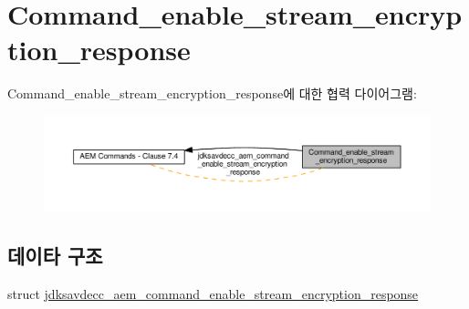 \hypertarget{group__command__enable__stream__encryption__response}{}\section{Command\+\_\+enable\+\_\+stream\+\_\+encryption\+\_\+response}
\label{group__command__enable__stream__encryption__response}
Command\+\_\+enable\+\_\+stream\+\_\+encryption\+\_\+response에 대한 협력 다이어그램\+:
\nopagebreak
\begin{figure}[H]
\begin{center}
\leavevmode
\includegraphics[width=350pt]{group__command__enable__stream__encryption__response}
\end{center}
\end{figure}
\subsection*{데이타 구조}
\begin{DoxyCompactItemize}
\item 
struct \hyperlink{structjdksavdecc__aem__command__enable__stream__encryption__response}{jdksavdecc\+\_\+aem\+\_\+command\+\_\+enable\+\_\+stream\+\_\+encryption\+\_\+response}
\end{DoxyCompactItemize}
